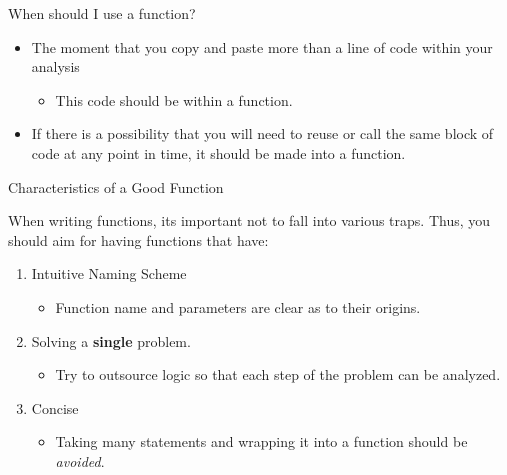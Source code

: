 \begin{frame}{When should I use a function?}

\begin{itemize}
\tightlist
\item
  The moment that you copy and paste more than a line of code within
  your analysis

  \begin{itemize}
  \tightlist
  \item
    This code should be within a function.
  \end{itemize}
\item
  If there is a possibility that you will need to reuse or call the same
  block of code at any point in time, it should be made into a function.
\end{itemize}

\end{frame}

\begin{frame}{Characteristics of a Good Function}

When writing functions, its important not to fall into various traps.
Thus, you should aim for having functions that have:

\begin{enumerate}
\def\labelenumi{\arabic{enumi}.}
\tightlist
\item
  Intuitive Naming Scheme

  \begin{itemize}
  \tightlist
  \item
    Function name and parameters are clear as to their origins.
  \end{itemize}
\item
  Solving a \textbf{single} problem.

  \begin{itemize}
  \tightlist
  \item
    Try to outsource logic so that each step of the problem can be
    analyzed.
  \end{itemize}
\item
  Concise

  \begin{itemize}
  \tightlist
  \item
    Taking many statements and wrapping it into a function should be
    \emph{avoided}.
  \end{itemize}
\end{enumerate}

\end{frame}


